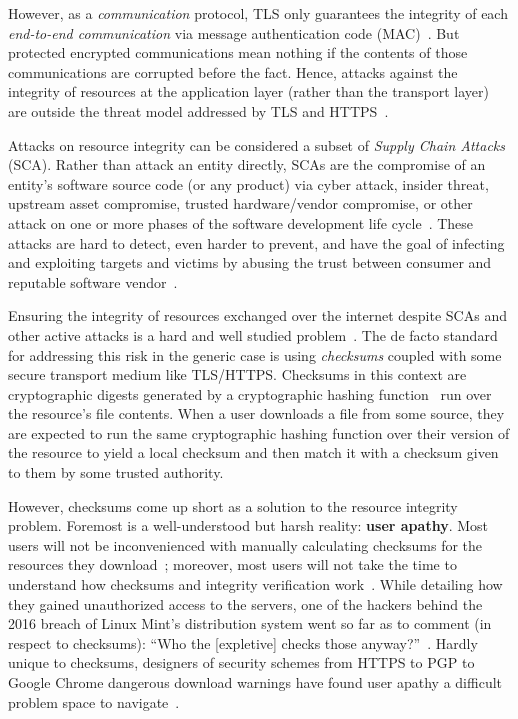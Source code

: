 However, as a \textit{communication} protocol, TLS only guarantees the integrity
of each \textit{end-to-end communication} via message authentication code
(MAC)~\cite{TLS1.2}. But protected encrypted communications mean nothing if the
contents of those communications are corrupted before the fact. Hence, attacks
against the integrity of resources at the application layer (rather than the
transport layer) are outside the threat model addressed by TLS and
HTTPS~\cite{TLS1.2, HTTPS}.

Attacks on resource integrity can be considered a subset of \emph{Supply Chain
Attacks} (SCA). Rather than attack an entity directly, SCAs are the compromise
of an entity's software source code (or any product) via cyber attack, insider
threat, upstream asset compromise, trusted hardware/vendor compromise, or other
attack on one or more phases of the software development life
cycle~\cite{NIST-SCA}. These attacks are hard to detect, even harder to prevent,
and have the goal of infecting and exploiting targets and victims by abusing the
trust between consumer and reputable software vendor~\cite{SCA}.

Ensuring the integrity of resources exchanged over the internet despite SCAs and
other active attacks is a hard and well studied problem~\cite{MD5Header,
HTTP1.1, HTTPS, SRI, LF, OpenPGP1, DNSSEC, PKI, Cherubini, Stickler}. The de
facto standard for addressing this risk in the generic case is using
\textit{checksums} coupled with some secure transport medium like TLS/HTTPS.
Checksums in this context are cryptographic digests generated by a cryptographic
hashing function~\cite{Rogaway} run over the resource's file contents. When a
user downloads a file from some source, they are expected to run the same
cryptographic hashing function over their version of the resource to yield a
local checksum and then match it with a checksum given to them by some trusted
authority.

However, checksums come up short as a solution to the resource integrity
problem. Foremost is a well-understood but harsh reality: \textbf{user apathy}.
Most users will not be inconvenienced with manually calculating checksums for
the resources they download~\cite{Cherubini, Fagan}; moreover, most users will
not take the time to understand how checksums and integrity verification
work~\cite{Cherubini, Tan, Hsiao}. While detailing how they gained unauthorized
access to the servers, one of the hackers behind the 2016 breach of Linux Mint's
distribution system went so far as to comment (in respect to checksums): ``Who
the [expletive] checks those anyway?''~\cite{SCA-MINT3}. Hardly unique to
checksums, designers of security schemes from HTTPS to PGP to Google Chrome
dangerous download warnings have found user apathy a difficult problem space to
navigate~\cite{PGPBad, Cherubini, Akhawe, ChromeClickThrough, Egelman1,
Egelman2, Modic, Reeder, Silic, Bianchi}.


